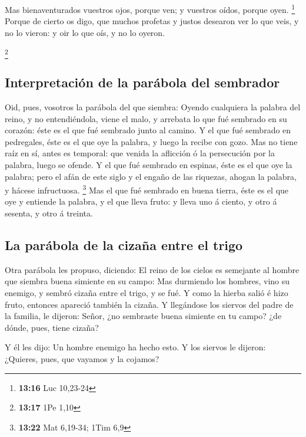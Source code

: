  Mas bienaventurados vuestros ojos, porque ven; y vuestros
oídos, porque oyen. \footnote{\textbf{13:16} Luc 10,23-24} 
Porque de cierto os digo, que muchos profetas y justos desearon ver lo
que veis, y no lo vieron: y oir lo que oís, y no lo oyeron.

\footnote{\textbf{13:17} 1Pe 1,10}

\hypertarget{interpretaciuxf3n-de-la-paruxe1bola-del-sembrador}{%
\subsection{Interpretación de la parábola del
sembrador}\label{interpretaciuxf3n-de-la-paruxe1bola-del-sembrador}}

 Oid, pues, vosotros la parábola del que siembra:
 Oyendo cualquiera la palabra del reino, y no
entendiéndola, viene el malo, y arrebata lo que fué sembrado en su
corazón: éste es el que fué sembrado junto al camino.  Y el
que fué sembrado en pedregales, éste es el que oye la palabra, y luego
la recibe con gozo.  Mas no tiene raíz en sí, antes es
temporal: que venida la aflicción ó la persecución por la palabra, luego
se ofende.  Y el que fué sembrado en espinas, éste es el
que oye la palabra; pero el afán de este siglo y el engaño de las
riquezas, ahogan la palabra, y hácese infructuosa. \footnote{\textbf{13:22}
  Mat 6,19-34; 1Tim 6,9}  Mas el que fué sembrado en buena
tierra, éste es el que oye y entiende la palabra, y el que lleva fruto:
y lleva uno á ciento, y otro á sesenta, y otro á treinta.

\hypertarget{la-paruxe1bola-de-la-cizauxf1a-entre-el-trigo}{%
\subsection{La parábola de la cizaña entre el
trigo}\label{la-paruxe1bola-de-la-cizauxf1a-entre-el-trigo}}

 Otra parábola les propuso, diciendo: El reino de los
cielos es semejante al hombre que siembra buena simiente en su campo:
 Mas durmiendo los hombres, vino su enemigo, y sembró
cizaña entre el trigo, y se fué.  Y como la hierba salió é
hizo fruto, entonces apareció también la cizaña.  Y
llegándose los siervos del padre de la familia, le dijeron: Señor, ¿no
sembraste buena simiente en tu campo? ¿de dónde, pues, tiene cizaña?

 Y él les dijo: Un hombre enemigo ha hecho esto. Y los
siervos le dijeron: ¿Quieres, pues, que vayamos y la cojamos?

